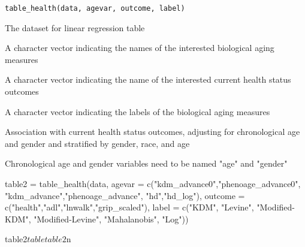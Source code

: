 \documentclass[a4paper]{book}
\begin{document}
%
\begin{Usage}
\begin{verbatim}
table_health(data, agevar, outcome, label)
\end{verbatim}
\end{Usage}
%
\begin{Arguments}
\begin{ldescription}
\item[\code{data}] The dataset for linear regression table

\item[\code{agevar}] A character vector indicating the names of the interested biological aging measures

\item[\code{outcome}] A character vector indicating the name of the interested current health status outcomes

\item[\code{label}] A character vector indicating the labels of the biological aging measures
\end{ldescription}
\end{Arguments}
%
\begin{Details}\relax
Association with current health status outcomes, adjusting for chronological age and gender and stratified by gender, race, and age
\end{Details}
%
\begin{Note}\relax
Chronological age and gender variables need to be named "age" and "gender"
\end{Note}
%
\begin{Examples}
\begin{ExampleCode}
table2 = table_health(data,
                      agevar = c("kdm_advance0","phenoage_advance0",
                               "kdm_advance","phenoage_advance",
                               "hd","hd_log"),
                      outcome = c("health","adl","lnwalk","grip_scaled"),
                      label = c("KDM\nBiological\nAge",
                                "Levine\nPhenotypic\nAge",
                                "Modified-KDM\nBiological\nAge",
                                "Modified-Levine\nPhenotypic\nAge",
                                "Mahalanobis\nDistance",
                                "Log\nMahalanobis\nDistance"))

table2$table
table2$n

\end{ExampleCode}
\end{Examples}
\end{document}

